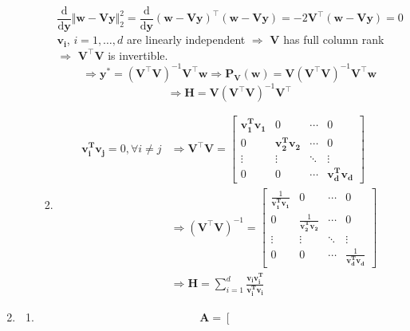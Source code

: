 \documentclass[11pt,letter,notitlepage]{article}
\newcommand{\proj}[2]{\textbf{P}_{#2} (#1)}
\theoremstyle{definition}
\begin{document}
\begin{solution}
\begin{enumerate}
\begin{enumerate}
\begin{enumerate}
\[			\]
			\[
			\frac{\mathrm{d}}{\mathrm{d} \mathbf{y}} \Vert \mathbf{w} - \mathbf{Vy} \Vert_2^2
			=
			\frac{\mathrm{d}}{\mathrm{d} \mathbf{y}} (\mathbf{w} - \mathbf{Vy})^{\top}(\mathbf{w} - \mathbf{Vy})
			=
			-2\mathbf{V}^{\top}(\mathbf{w} - \mathbf{Vy})
			=
			0
			\]
			$\mathbf{v_i}$, $i=1,\ldots,d$ are linearly independent $\Longrightarrow$ $\mathbf{V}$ has full column rank $\Longrightarrow$ $\mathbf{V}^{\top}\mathbf{V}$ is invertible.
			\[
			\Longrightarrow
			\mathbf{y}^*
			=
			(\mathbf{V}^{\top}\mathbf{V})^{-1}\mathbf{V}^{\top}\mathbf{w}
			\Longrightarrow
			\proj{\mathbf{w}}{\mathbf{V}}
			=
			\mathbf{V}(\mathbf{V}^{\top}\mathbf{V})^{-1}\mathbf{V}^{\top}\mathbf{w}
			\]
			\[
			\Longrightarrow
			\mathbf{H}
			=
			\mathbf{V}(\mathbf{V}^{\top}\mathbf{V})^{-1}\mathbf{V}^{\top}
			\]
			\item 
			\begin{align*}
			\mathbf{v_i^T}\mathbf{v_j}
			=
			0, \forall i \neq j
			&\Longrightarrow
			\mathbf{V}^{\top}\mathbf{V}
			=
			\left[\begin{matrix}
			\mathbf{v_1^T}\mathbf{v_1} & 0 & \cdots & 0\\
			0 & \mathbf{v_2^T}\mathbf{v_2} & \cdots & 0\\
			\vdots & \vdots & \ddots & \vdots\\
			0 & 0 & \cdots & \mathbf{v_d^T}\mathbf{v_d}
			\end{matrix}\right]\\
			&\Longrightarrow
			(\mathbf{V}^{\top}\mathbf{V})^{-1}
			=
			\left[\begin{matrix}
			\frac{1}{\mathbf{v_1^T}\mathbf{v_1}} & 0 & \cdots & 0\\
			0 & \frac{1}{\mathbf{v_2^T}\mathbf{v_2}} & \cdots & 0\\
			\vdots & \vdots & \ddots & \vdots\\
			0 & 0 & \cdots & \frac{1}{\mathbf{v_d^T}\mathbf{v_d}}
			\end{matrix}\right]\\
			&\Longrightarrow
			\mathbf{H}
			=
			\sum\limits_{i=1}^{d} \frac{\mathbf{v_i}\mathbf{v_i^T}}{\mathbf{v_i^T}\mathbf{v_i}}
			\end{align*}
		\end{enumerate}
	\end{enumerate}
	\item 
	\begin{enumerate}
		\item 
		\[
		\mathbf{A} = \left[
		\begin{matrix}

\end{matrix}\]
\end{enumerate}
\end{enumerate}
\end{solution}
\end{document}
